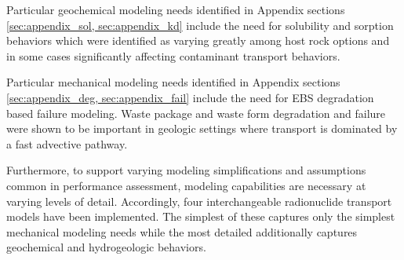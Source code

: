Particular geochemical modeling needs identified in Appendix sections 
\ref{sec:appendix_sol, sec:appendix_kd} include the need for solubility and 
sorption behaviors which were identified as varying greatly among host rock 
options and in some cases significantly affecting contaminant transport 
behaviors. 

Particular mechanical modeling needs identified in Appendix sections 
\ref{sec:appendix_deg, sec:appendix_fail} include the need for \gls{EBS} 
degradation based failure modeling. Waste package and waste form degradation 
and failure were shown to be important in geologic settings where transport is 
dominated by a fast advective pathway. 

Furthermore, to support varying modeling simplifications and assumptions common 
in performance assessment, modeling capabilities are necessary at varying 
levels of detail.  Accordingly, four interchangeable radionuclide transport 
models have been implemented. The simplest of these captures only the simplest 
mechanical modeling needs while the most detailed additionally captures 
geochemical and hydrogeologic behaviors.

